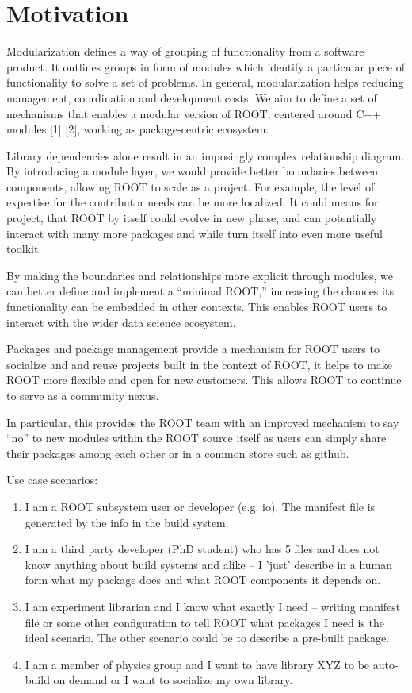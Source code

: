 \documentclass{webofc}
\begin{document}
\section{Motivation}

Modularization defines a way of grouping of functionality from a software product. It outlines groups in form of modules which identify a particular piece of functionality to solve a set of problems. In general, modularization helps reducing management, coordination and development costs.
We aim to define a set of mechanisms that enables a modular version of ROOT, centered around C++ modules [1] [2], working as package-centric ecosystem.

Library dependencies alone result in an imposingly complex relationship diagram. By introducing a module layer, we would provide better boundaries between components, allowing ROOT to scale as a project. For example, the level of expertise for the contributor needs can be more localized. It could means for project, that ROOT by itself could evolve in new phase, and can potentially interact with many more packages and while turn itself into even more useful toolkit. 

By making the boundaries and relationships more explicit through modules, we can better define and implement a “minimal ROOT,” increasing the chances its functionality can be embedded in other contexts.  This enables ROOT users to interact with the wider data science ecosystem.

Packages and package management provide a mechanism for ROOT users to socialize and and reuse projects built in the context of ROOT, it helps to make ROOT more flexible and open for new customers.  This allows ROOT to continue to serve as a community nexus.

In particular, this provides the ROOT team with an improved mechanism to say “no” to new modules within the ROOT source itself as users can simply share their packages among each other or in a common store such as github.

Use case scenarios:
\begin{enumerate}
\item I am a ROOT subsystem user or developer (e.g. io). The manifest file is generated by the info in the build system.
\item I am a third party developer (PhD student) who has 5 files and does not know anything about build systems and alike -- I 'just' describe in a human form what my package does and what ROOT components it depends on.
\item I am experiment librarian and I know what exactly I need -- writing manifest file or some other configuration to tell ROOT what packages I need is the ideal scenario. The other scenario could be to describe a pre-built package.
\item I am a member of physics group and I want to have library XYZ to be auto-build on demand or I want to socialize my own library.
\end{enumerate}
\end{document}

